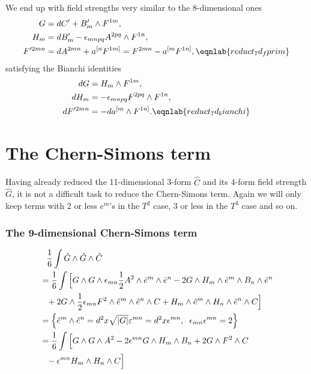 We end up with field strengths very similar to the 8-dimensional ones
\begin{align}
G &= dC' + B_{m}' \wedge F^{1m}, \nonumber \\
H_m &= dB_{m}' -  {\epsilon}_{mnpq} A^{2pq}\wedge F^{1n} , \nonumber \\
F'^{2mn} &= dA^{2mn} + a^{[n} F^{1m]} = F^{2mn} - a^{[m}F^{1n]},
\eqnlab{reduct_7d_fprim}
\end{align}
satisfying the Bianchi identities
\begin{align}
dG &= H_m \wedge F^{1m}, \nonumber \\
dH_m &= -{\epsilon}_{mnpq} F^{2pq} \wedge F^{1n}, \nonumber \\
dF'^{2mn} &= - da^{[m} \wedge F^{1n]}.
\eqnlab{reduct_7d_bianchi}
\end{align}

\section{The Chern-Simons term}
Having already reduced the 11-dimensional 3-form $\hat{C}$ and its 4-form field strength $\hat{G}$, it is not a difficult task to reduce the Chern-Simons term.
Again we will only keep terms with 2 or less $e^m$'s in the $T^2$ case, 3 or less in the $T^3$ case and so on.

\subsubsection{The 9-dimensional Chern-Simons term}
\begin{align}
&\phantom{=}{1 \over 6} \int \hat{G} \wedge \hat{G} \wedge \hat{C} \nonumber \\
&={1 \over 6} \int \Big{[} G \wedge G \wedge \epsilon_{mn} {1 \over 2}A^2 \wedge \hat{e}^m \wedge \hat{e}^n - 2 G \wedge H_m \wedge \hat{e}^m \wedge B_n \wedge \hat{e}^n \nonumber \\
&\phantom{=} + 2 G \wedge {1 \over 2} \epsilon_{mn} F^2 \wedge \hat{e}^m \wedge \hat{e}^n \wedge C + H_m \wedge \hat{e}^m \wedge H_n \wedge \hat{e}^n \wedge C \Big{]} \nonumber \\
&= \Big{\{} \hat{e}^m \wedge \hat{e}^n = d^2 x \sqrt{|G|}{\varepsilon}^{mn} = d^2 x \epsilon^{mn},\hspace{0.2cm} {\epsilon}_{mn} {\epsilon}^{mn} = 2 \Big{\}} \nonumber \\
&= {1 \over 6} \int \Big{[} G \wedge G \wedge A^2 - 2\epsilon^{mn} G \wedge H_m \wedge B_n +2 G \wedge F^2 \wedge C \nonumber \\
&\phantom{=} - \epsilon^{mn} H_m \wedge H_n \wedge C \Big{]}
\end{align}

